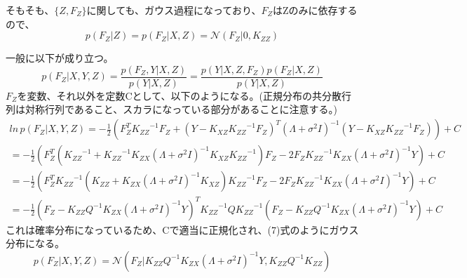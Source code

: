 ﻿\documentclass{jsarticle}
\begin{document}
そもそも、$\{ Z, F_Z \}$に関しても、ガウス過程になっており、$F_Z$はZのみに依存するので、
\begin{equation}
p(F_Z | Z) = p(F_Z | X, Z) = \mathcal{N}(F_Z | 0, K_{ZZ})
\end{equation}

一般に以下が成り立つ。
\begin{equation}
p(F_Z | X, Y, Z) = \frac{p(F_Z, Y | X, Z)}{p(Y | X, Z)} = \frac{p(Y | X, Z, F_Z)p(F_Z | X, Z)}{p(Y | X, Z)}
\end{equation}
$F_Z$を変数、それ以外を定数Cとして、以下のようになる。(正規分布の共分散行列は対称行列であること、スカラになっている部分があることに注意する。)
\begin{equation}
\begin{split}
ln \, p(F_Z | X, Y, Z) = -\frac{1}{2} (F_Z^T {K_{ZZ}}^{-1} F_Z + (Y - K_{XZ} {K_{ZZ}}^{-1} F_Z)^T (\Lambda + \sigma^2 I)^{-1}(Y - K_{XZ} {K_{ZZ}}^{-1} F_Z)) + C\\
= -\frac{1}{2} (F_Z^T ({K_{ZZ}}^{-1} + {K_{ZZ}}^{-1} K_{ZX} (\Lambda + \sigma^2 I)^{-1} K_{XZ} {K_{ZZ}}^{-1})F_Z - 2F_Z {K_{ZZ}}^{-1} K_{ZX} (\Lambda + \sigma^2 I)^{-1}Y) + C\\
= -\frac{1}{2} (F_Z^T {K_{ZZ}}^{-1}(K_{ZZ} + K_{ZX} (\Lambda + \sigma^2 I)^{-1} K_{XZ}){K_{ZZ}}^{-1}F_Z - 2F_Z {K_{ZZ}}^{-1} K_{ZX} (\Lambda + \sigma^2 I)^{-1}Y) + C\\
= -\frac{1}{2} (F_Z - {K_{ZZ}} Q^{-1} K_{ZX}(\Lambda + \sigma^2 I)^{-1}Y)^T {K_{ZZ}}^{-1} Q {K_{ZZ}}^{-1} (F_Z - {K_{ZZ}} Q^{-1} K_{ZX}(\Lambda + \sigma^2 I)^{-1}Y) + C
\end{split}
\end{equation}
これは確率分布になっているため、Cで適当に正規化され、(7)式のようにガウス分布になる。
\begin{equation}
p(F_Z | X, Y, Z)
= \mathcal{N}(F_Z | {K_{ZZ}} Q^{-1} K_{ZX}(\Lambda + \sigma^2 I)^{-1}Y, {K_{ZZ}} Q^{-1} {K_{ZZ}})
\end{equation}
\end{document}
